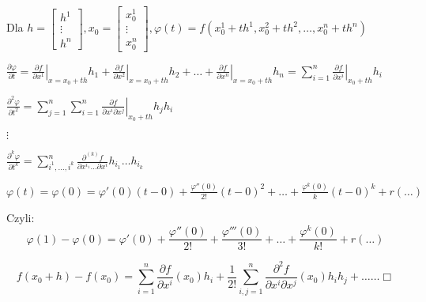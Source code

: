 \documentclass[../main.tex]{subfiles}
\begin{document}
\vspace{0.5cm}
Dla $h=\left [ \begin{matrix}
h^1\\
\vdots\\
h^n\end{matrix}\right ] ,
x_0 = \left [ \begin{matrix}
x_0^1\\
\vdots\\
x_0^n\end{matrix}\right ],
\varphi(t) = f(x_0^1+th^1,x_0^2+th^2,\dots,x_0^n+th^n)$
\vspace{0.5cm}

$\frac{\partial \varphi}{\partial t} = \left .\frac{\partial f}{\partial x^1} \right |_{x=x_0+th} h_1 + \left .\frac{\partial f}{\partial x^2} \right |_{x=x_0+th} h_2 + \dots + \left .\frac{\partial f}{\partial x^n} \right |_{x=x_0+th} h_n = \left .\sum_{i=1}^n \frac{\partial f}{\partial x^i} \right |_{x_0+th}h_i$

$\frac{\partial^2 \varphi}{\partial t^2} = \left .\sum_{j=1}^n \sum_{i=1}^n \frac{\partial f}{\partial x^i \partial x^j} \right |_{x_0+th} h_j h_i$

$\vdots$

$\frac{\partial^k \varphi}{\partial t^k} = \sum_{i^1,\dots,i^k}^n \frac{\partial^{(k)} f}{\partial x^{i_{1}} \dots \partial x^{i}} h_{i_1}\dots h_{i_k}$

$\varphi(t) = \varphi(0) = \varphi'(0)(t-0)+\frac{\varphi''(0)}{2!}(t-0)^2+\dots+\frac{\varphi^k(0)}{k}(t-0)^k + r(\dots)$

Czyli:
$$\varphi(1)-\varphi(0) = \varphi'(0)+\frac{\varphi''(0)}{2!} + \frac{\varphi'''(0)}{3!} + \dots + \frac{\varphi^k(0)}{k!}+r(\dots)$$

$$f(x_0+h)-f(x_0)=\sum_{i=1}^n \frac{\partial f}{\partial x^i} (x_0) h_i + \frac{1}{2!} \sum_{i,j=1}^n \frac{\partial^2 f}{\partial x^i \partial x^j} (x_0)h_ih_j + \dots \dots \Box$$
\end{document}
